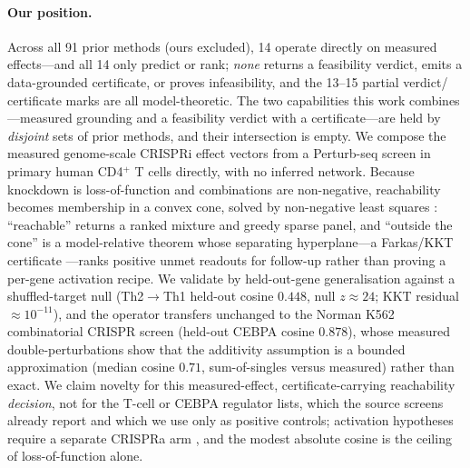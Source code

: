 \paragraph{Our position.}
Across all 91 prior methods (ours excluded), 14 operate directly on measured effects---and
all 14 only predict or rank; \emph{none} returns a feasibility verdict, emits a
data-grounded certificate, or proves infeasibility, and the 13--15 partial verdict/%
certificate marks are all model-theoretic. The two capabilities this work
combines---measured grounding and a feasibility verdict with a certificate---are held by
\emph{disjoint} sets of prior methods, and their intersection is empty. We compose the
measured genome-scale CRISPRi effect vectors from a Perturb-seq screen in primary human
CD4$^+$ T cells \citep{Zhu2025} directly, with no inferred network. Because knockdown is
loss-of-function and combinations are non-negative, reachability becomes membership in a
convex cone, solved by non-negative least squares \citep{LawsonHanson1974}: ``reachable''
returns a ranked mixture and greedy sparse panel, and ``outside the cone'' is a model-relative
theorem whose separating hyperplane---a Farkas/KKT certificate \citep{Farkas1902}---ranks
positive unmet readouts for follow-up rather than proving a per-gene activation recipe. We
validate by held-out-gene generalisation against a shuffled-target null
(Th2$\rightarrow$Th1 held-out cosine $0.448$, null $z\approx24$; KKT residual
$\approx\!10^{-11}$), and the operator transfers unchanged to the Norman K562 combinatorial
CRISPR screen \citep{Norman2019} (held-out CEBPA cosine $0.878$), whose measured
double-perturbations show that the additivity assumption is a bounded approximation (median
cosine $0.71$, sum-of-singles versus measured) rather than exact. We claim novelty for this
measured-effect, certificate-carrying reachability \emph{decision}, not for the T-cell or
CEBPA regulator lists, which the source screens \citep{Zhu2025,Norman2019} already report
and which we use only as positive controls; activation hypotheses require a separate CRISPRa
arm \citep{Schmidt2022}, and the modest absolute cosine is the ceiling of
loss-of-function alone.
